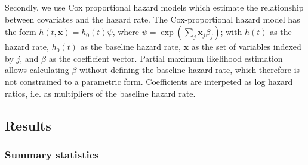 \documentclass[12pt]{article}
\begin{document}
Secondly, we use Cox proportional hazard models which estimate the relationship between covariates and the hazard rate.
The Cox-proportional hazard model has the form \(h(t,\mathbf{x}) = h_0(t) \psi\), where \(\psi = \exp(\sum_{j} \mathbf{x}_j \beta_j)\); with \(h(t)\) as the hazard rate, \(h_0(t)\) as the baseline hazard rate, \(\mathbf{x}\) as the set of variables indexed by \(j\), and \(\beta\) as the coefficient vector.
Partial maximum likelihood estimation allows calculating \(\beta\) without defining the baseline hazard rate, which therefore is not constrained to a parametric form. 
Coefficients are interpeted as log hazard ratios, i.e. as multipliers of the baseline hazard rate. 



\subsection*{Results}
\label{sec:org9e38ff3}

\subsubsection*{Summary statistics}
\label{sec:org12efa6c}
\end{document}
